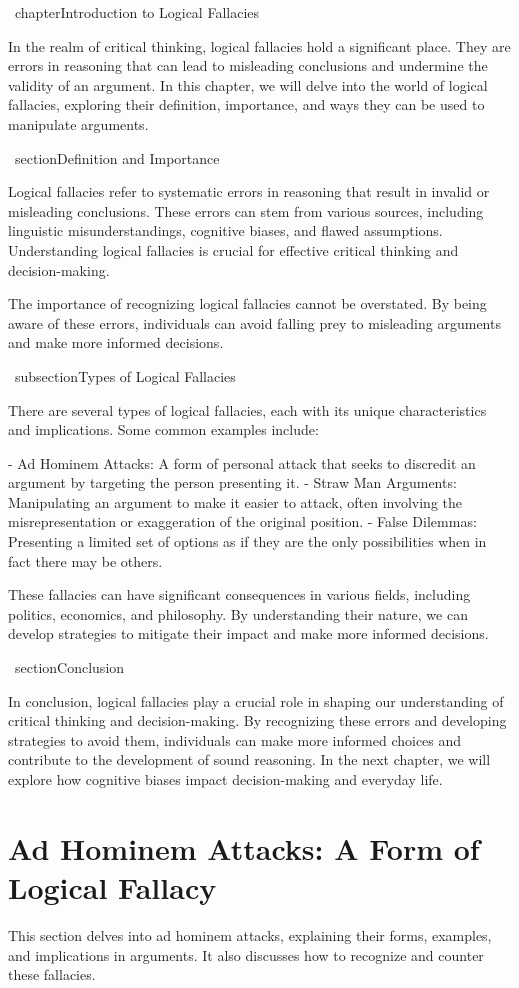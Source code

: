 \documentclass{report}%
\begin{document}
{{{%
\ chapter{Introduction to Logical Fallacies}

In the realm of critical thinking, logical fallacies hold a significant place. They are errors in reasoning that can lead to misleading conclusions and undermine the validity of an argument. In this chapter, we will delve into the world of logical fallacies, exploring their definition, importance, and ways they can be used to manipulate arguments.

\ section{Definition and Importance}

Logical fallacies refer to systematic errors in reasoning that result in invalid or misleading conclusions. These errors can stem from various sources, including linguistic misunderstandings, cognitive biases, and flawed assumptions. Understanding logical fallacies is crucial for effective critical thinking and decision-making.

The importance of recognizing logical fallacies cannot be overstated. By being aware of these errors, individuals can avoid falling prey to misleading arguments and make more informed decisions.

\ subsection{Types of Logical Fallacies}

There are several types of logical fallacies, each with its unique characteristics and implications. Some common examples include:

- Ad Hominem Attacks: A form of personal attack that seeks to discredit an argument by targeting the person presenting it.
- Straw Man Arguments: Manipulating an argument to make it easier to attack, often involving the misrepresentation or exaggeration of the original position.
- False Dilemmas: Presenting a limited set of options as if they are the only possibilities when in fact there may be others.

These fallacies can have significant consequences in various fields, including politics, economics, and philosophy. By understanding their nature, we can develop strategies to mitigate their impact and make more informed decisions.

\ section{Conclusion}

In conclusion, logical fallacies play a crucial role in shaping our understanding of critical thinking and decision-making. By recognizing these errors and developing strategies to avoid them, individuals can make more informed choices and contribute to the development of sound reasoning. In the next chapter, we will explore how cognitive biases impact decision-making and everyday life.%
\section{Ad Hominem Attacks: A Form of Logical Fallacy}%
This section delves into ad hominem attacks, explaining their forms, examples, and implications in arguments. It also discusses how to recognize and counter these fallacies.

}}}
\end{document}
